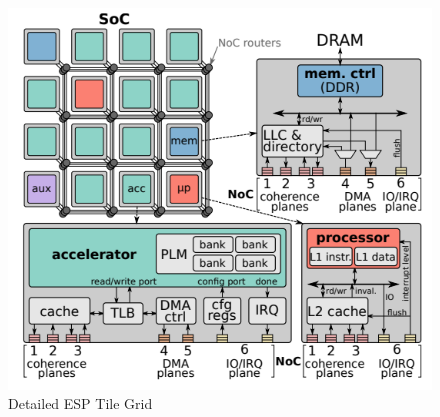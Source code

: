 
\begin{figure}[h]
  \centering
  \captionsetup{justification=centering, format=hang}
  \includegraphics[width=1\columnwidth]{fig/noccache.png}
  \caption{Detailed ESP Tile Grid~\cite{giri18}}
  \label{fig:esp_tile}
  \end{figure}

